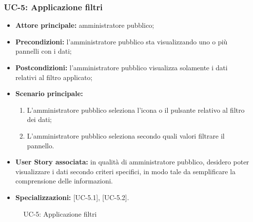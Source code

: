 \documentclass[8pt]{article}
\begin{document}
\subsubsection*{UC-5: Applicazione filtri}
\begin{itemize}
    \item \textbf{Attore principale:} amministratore pubblico;
    \item \textbf{Precondizioni:} l’amministratore pubblico sta visualizzando uno o più pannelli con i dati;
    \item \textbf{Postcondizioni:} l’amministratore pubblico visualizza solamente i dati relativi al filtro
applicato;
    \item \textbf{Scenario principale:}
        \begin{enumerate}
        \item L’amministratore pubblico seleziona l’icona o il pulsante relativo al filtro dei dati;
        \item L’amministratore pubblico seleziona secondo quali valori filtrare il pannello.
        \end{enumerate}
    \item \textbf{User Story associata:} in qualità di amministratore pubblico, desidero poter
        visualizzare i dati secondo criteri specifici, in modo tale da semplificare la comprensione
        delle informazioni.
    \item \textbf{Specializzazioni:} [UC-5.1], [UC-5.2].
\end{itemize}

\begin{figure}[ht!]
    \centering
    \caption{UC-5: Applicazione filtri}
    \label{fig:UC-5: Applicazione filtri}
\end{figure}
\end{document}
